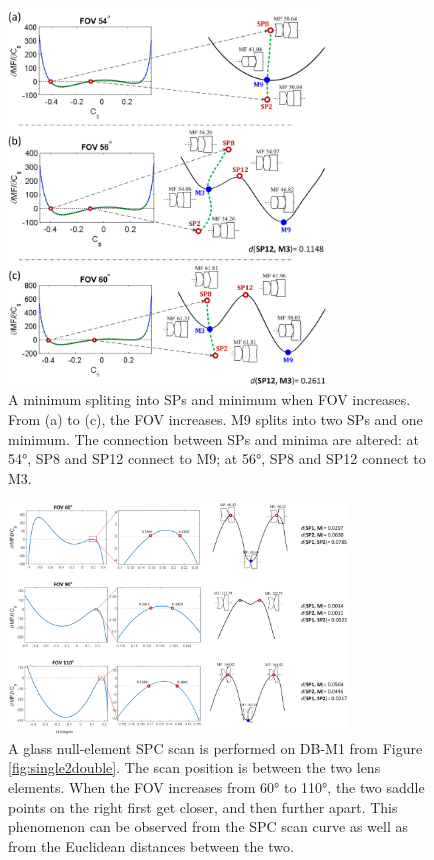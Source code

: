 \begin{figure}[h!]
    \centering
    \includegraphics[width=0.75\textwidth]{chapter-3/figures/SystemBorn.png}
    \caption{A minimum spliting into SPs and minimum when FOV increases. From (a) to (c), the FOV increases. M9 splits into two SPs and one minimum. The connection between SPs and minima are altered: at 54°, SP8 and SP12 connect to M9; at 56°, SP8 and SP12 connect to M3.}
    \label{fig:systemborn}
\end{figure}

\begin{figure}[h!]
    \centering
    \includegraphics[width=0.8\textwidth]{chapter-3/figures/SystemReborn_vt.png}
    \caption{A glass null-element SPC scan is performed on DB-M1 from Figure \ref{fig:single2double}. The scan position is between the two lens elements. When the FOV increases from 60° to 110°, the two saddle points on the right first get closer, and then further apart. This phenomenon can be observed from the SPC scan curve as well as from the Euclidean distances between the two.}
    \label{fig:systemreborn}
\end{figure}

